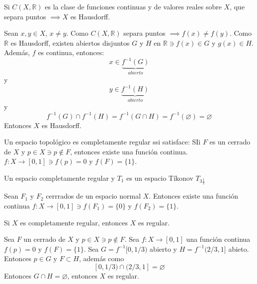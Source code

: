 \begin{prop}
    Si $C(X,\mathbb{R})$ es la clase de funciones continuas y de valores reales sobre $X$, que separa puntos $\implies X$ es Hausdorff. 
    \begin{dem}
        Sean $x,y\in X$, $x\neq y$. Como $C(X,\mathbb{R})$ separa puntos $\implies f(x)\neq f(y)$. Como $\mathbb{R}$ es Hausdorff, existen abiertos disjuntos $G$ y $H$ en $\mathbb{R}\ni f(x)\in G$ y $g(x)\in H$. Además, $f$ es continua, entonces: 
        $$x\in \underbrace{f^{-1}(G)}_{abierto}$$
        y  
        $$y\in \underbrace{f^{-1}(H)}_{abierto}$$
        y 
        $$f^{-1}(G)\cap f^{-1}(H)= f^{-1}(G\cap H)=f^{-1}(\varnothing)=\varnothing$$
        Entonces $X$ es Hausdorff.
    \end{dem}
\end{prop}


\begin{definicion}
    Un espacio topológico es completamente regular ssi satisface: SIi $F$ es un cerrado de $X$ y $p\in X\ni p\not\in F$, entonces existe una función continua. $f:X\to [0,1]\ni f(p)=0$ y $f(F)=\{1\}$.
\end{definicion}


\begin{nota}
    Un espacio completamente regular y $T_1$ es un espacio  Tíkonov $T_{3  \frac{1}{2}}$
\end{nota}


\begin{nota}
    Sean $F_1$ y $F_2$ cerrrados de un espacio normal $X$. Entonces existe una función continua $f:X\to [0,1]\ni f(F_1)=\{0\}$ y $f(F_2)=\{1\}$.
\end{nota}

\begin{teorema}
    Si $X$ es completamente regular, entonces $X$ es regular. 
    \begin{dem}
        Sea $F$ un cerrado de $X$ y $p\in X\ni p\not\in F$. Sea $f:X\to [0,1]$ una función continua $f(p)=0$ y $f(F)=\{1\}$. Sea $G=f^{-1}[0,1/3)$ abierto y $H=f^{-1}(2/3,1]$ abieto. Entonces $p\in G$ y $F\subset H$, además como $$[0,1/3)\cap (2/3,1]=\varnothing$$
        Entonces $G\cap H=\varnothing$, entonces $X$ es regular. 
    \end{dem}
\end{teorema}
